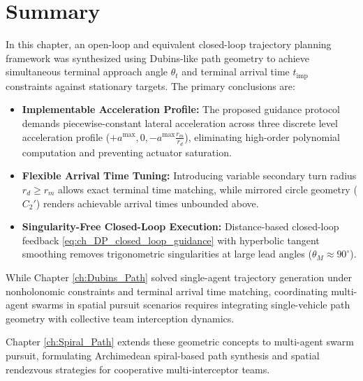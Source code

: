 \section{Summary}\label{sec:ch_DP_summary}
In this chapter, an open-loop and equivalent closed-loop trajectory planning framework was synthesized using Dubins-like path geometry to achieve simultaneous terminal approach angle $\theta_t$ and terminal arrival time $t_{\text{imp}}$ constraints against stationary targets. The primary conclusions are:
\begin{itemize}
    \item \textbf{Implementable Acceleration Profile:} The proposed guidance protocol demands piecewise-constant lateral acceleration across three discrete level acceleration profile ($+a^{\max}, 0, -a^{\max} \frac{r_m}{r_d}$), eliminating high-order polynomial computation and preventing actuator saturation.
    \item \textbf{Flexible Arrival Time Tuning:} Introducing variable secondary turn radius $r_d \ge r_m$ allows exact terminal time matching, while mirrored circle geometry ($C_2'$) renders achievable arrival times unbounded above.
    \item \textbf{Singularity-Free Closed-Loop Execution:} Distance-based closed-loop feedback \eqref{eq:ch_DP_closed_loop_guidance} with hyperbolic tangent smoothing removes trigonometric singularities at large lead angles ($\theta_M \approx 90^\circ$).
\end{itemize}

\vspace{0.5em}
\noindent %
While Chapter \ref{ch:Dubins_Path} solved single-agent trajectory generation under nonholonomic constraints and terminal arrival time matching, coordinating multi-agent swarms in spatial pursuit scenarios requires integrating single-vehicle path geometry with collective team interception dynamics. 

Chapter \ref{ch:Spiral_Path} extends these geometric concepts to multi-agent swarm pursuit, formulating Archimedean spiral-based path synthesis and spatial rendezvous strategies for cooperative multi-interceptor teams.










